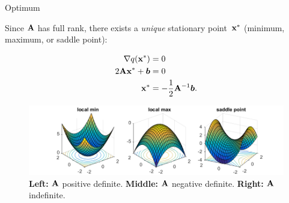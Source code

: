 \documentclass[11pt,compress,t,notes=noshow, xcolor=table]{beamer}
\begin{document}
\begin{vbframe}{Optimum}

Since $\mathbf{A}$ has full rank, there exists a \textit{unique} stationary point~$\mathbf{x}^\ast$ (minimum, maximum, or saddle point):

\vspace{-\baselineskip}

\begin{align*}
    \nabla q(\mathbf{x}^\ast) &= 0 \\
    2 \mathbf{A} \mathbf{x}^\ast + \bm{b} &= 0 \\
    \mathbf{x}^\ast &= -\frac{1}{2} \mathbf{A}^{-1} \bm{b}.
\end{align*}  

\vspace{-0.5\baselineskip}

\begin{figure}
    \centering
    \includegraphics[width=\textwidth]{figure_man/minmaxsaddle.png}
    \caption*{
        \footnotesize
        \textbf{Left:} $\mathbf{A}$ positive definite.
        \textbf{Middle:} $\mathbf{A}$ negative definite.
        \textbf{Right:} $\mathbf{A}$ indefinite.}
\end{figure}

\end{vbframe}
\end{document}
